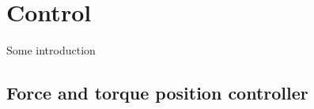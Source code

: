 \chapter{Control}
\label{control}

Some introduction

\section{Force and torque position controller}